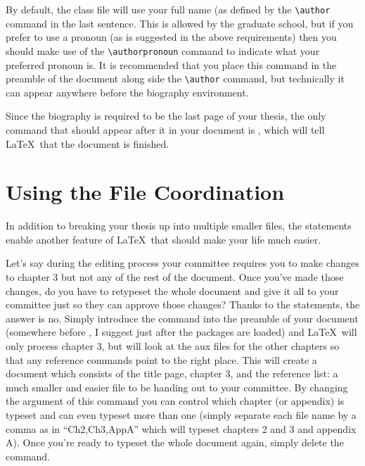 By default, the class file will use your full name (as defined by the \verb=\author= command in the last sentence.  This is allowed by the graduate school, but if you prefer to use a pronoun (as is suggested in the above requirements) then you should make use of the \verb=\authorpronoun= command to indicate what your preferred pronoun is.  It is recommended that you place this command in the preamble of the document along side the \verb=\author= command, but technically it can appear anywhere before the biography environment.

Since the biography is required to be the last page of your thesis, the only command that should appear after it in your document is \verb==, which will tell \LaTeX\ that the document is finished.


\section{Using the File Coordination}\label{coord}

In addition to breaking your thesis up into multiple smaller files, the \verb== statements enable another feature of \LaTeX\ that should make your life much easier.

Let's say during the editing process your committee requires you to make changes to chapter 3 but not any of the rest of the document.  Once you've made those changes, do you have to retypeset the whole document and give it all to your committee just so they can approve those changes?  Thanks to the \verb== statements, the answer is no.  Simply introduce the command \verb== into the preamble of your document (somewhere before \verb==, I suggest just after the packages are loaded) and \LaTeX\ will only process chapter 3, but will look at the aux files for the other chapters so that any reference commands point to the right place.  This will create a document which consists of the title page, chapter 3, and the reference list: a much smaller and easier file to be handing out to your committee.  By changing the argument of this command you can control which chapter (or appendix) is typeset and can even typeset more than one (simply separate each file name by a comma as in ``Ch2,Ch3,AppA'' which will typeset chapters 2 and 3 and appendix A).  Once you're ready to typeset the whole document again, simply delete the \verb== command.

